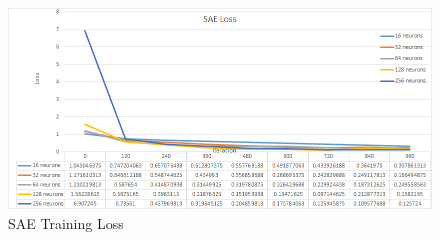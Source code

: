 \documentclass[draft,dvipsnames]{drexel-thesis}
\begin{document}
\begin{thesis}
\begin{figure}[t!]
    \centering
    \includegraphics[width=\textwidth]{pictures/result_pictures/SAE_Loss.png}
    \caption{SAE Training Loss}
    \label{fig:sae_loss}
\end{figure}


\end{thesis}
\end{document}
